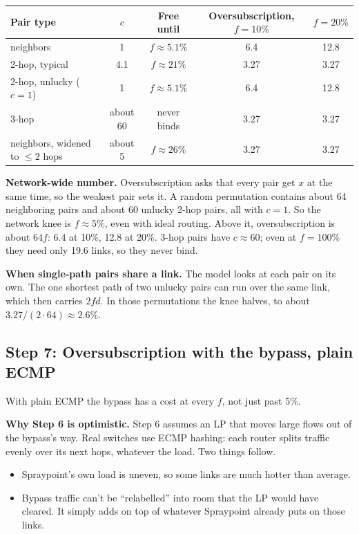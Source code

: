 \begin{center}
\begin{tabular}{@{}lcccc@{}}
\toprule
Pair type & $c$ & Free until & Oversubscription, $f = 10\%$ & $f = 20\%$ \\
\midrule
neighbors & 1 & $f \approx 5.1\%$ & 6.4 & 12.8 \\
2-hop, typical & 4.1 & $f \approx 21\%$ & 3.27 & 3.27 \\
2-hop, unlucky ($c = 1$) & 1 & $f \approx 5.1\%$ & 6.4 & 12.8 \\
3-hop & about 60 & never binds & 3.27 & 3.27 \\
neighbors, widened to $\le 2$ hops & about 5 & $f \approx 26\%$ & 3.27 & 3.27 \\
\bottomrule
\end{tabular}
\end{center}

\textbf{Network-wide number.} Oversubscription asks that every pair get $x$ at the same time, so the weakest pair sets it. A random permutation contains about 64 neighboring pairs and about 60 unlucky 2-hop pairs, all with $c = 1$. So the network knee is $f \approx 5\%$, even with ideal routing. Above it, oversubscription is about $64 f$: 6.4 at 10\%, 12.8 at 20\%. 3-hop pairs have $c \approx 60$; even at $f = 100\%$ they need only 19.6 links, so they never bind.

\textbf{When single-path pairs share a link.} The model looks at each pair on its own. The one shortest path of two unlucky pairs can run over the same link, which then carries $2 f d$. In those permutations the knee halves, to about $3.27 / (2 \cdot 64) \approx 2.6\%$.

\subsection{Step 7: Oversubscription with the bypass, plain ECMP}

With plain ECMP the bypass has a cost at every $f$, not just past 5\%.

\textbf{Why Step 6 is optimistic.} Step 6 assumes an LP that moves large flows out of the bypass's way. Real switches use ECMP hashing: each router splits traffic evenly over its next hops, whatever the load. Two things follow.
\begin{itemize}
  \item Spraypoint's own load is uneven, so some links are much hotter than average.
  \item Bypass traffic can't be ``relabelled'' into room that the LP would have cleared. It simply adds on top of whatever Spraypoint already puts on those links.
\end{itemize}


